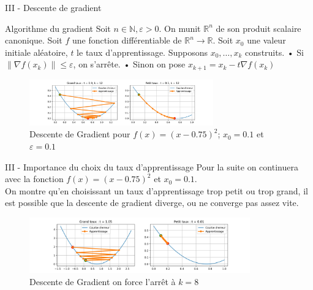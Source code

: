 \documentclass[10pt]{beamer}
\newcommand{\norme}[1]{\| #1 \|}
\begin{document}
\begin{frame}{III - Descente de gradient}
\begin{block}{Algorithme du gradient}
Soit $n \in \mathbb{N}, \varepsilon > 0$. On munit $\mathbb{R}^n$ de son produit scalaire canonique. \newline
    Soit $f$ une fonction différentiable de $\mathbb{R}^n \to \mathbb{R}$. \newline
    Soit $x_0$ une valeur initiale aléatoire, $t$ le taux d'apprentissage. \newline
    Supposons $x_0, \ldots, x_k$ construits. \newline
    • Si $\norme{\nabla f(x_k)} \leq \varepsilon$, on s'arrête. \newline
    • Sinon on pose $x_{k+1} = x_k - t \nabla f(x_k)$ \newline
\end{block}

\begin{figure}
	\centering
    \includegraphics[height=75px]{1-DescenteGradient.jpg}
	\caption{Descente de Gradient pour $f(x) = (x-0.75)^2$; $x_0=0.1$ et $\varepsilon = 0.1$}
\end{figure}
\end{frame}

\begin{frame}{III - Importance du choix du taux d'apprentissage}
Pour la suite on continuera avec la fonction $f(x) = (x-0.75)^2$ et $x_0=0.1$. \\
On montre qu'en choisissant un taux d'apprentissage trop petit ou trop grand, il est possible que la descente de gradient diverge, ou ne converge pas assez vite.
\begin{figure}
	\centering
    \includegraphics[height=90px]{2-DescenteGradient.jpg}
	\caption{Descente de Gradient on force l'arrêt à $k=8$}
\end{figure}
\end{frame}
\end{document}
